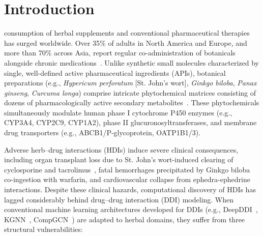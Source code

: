 \documentclass[10pt,journal,compsoc]{IEEEtran}
\begin{document}
\maketitle
\IEEEdisplaynontitleabstractindextext
\IEEEpeerreviewmaketitle

\section{Introduction}
 consumption of herbal supplements and conventional pharmaceutical therapies has surged worldwide. Over 35\% of adults in North America and Europe, and more than 70\% across Asia, report regular co-administration of botanicals alongside chronic medications~\cite{izzo2012interactions}. Unlike synthetic small molecules characterized by single, well-defined active pharmaceutical ingredients (APIs), botanical preparations (e.g., \textit{Hypericum perforatum} [St. John's wort], \textit{Ginkgo biloba}, \textit{Panax ginseng}, \textit{Curcuma longa}) comprise intricate phytochemical matrices consisting of dozens of pharmacologically active secondary metabolites~\cite{foti2012botanical}. These phytochemicals simultaneously modulate human phase I cytochrome P450 enzymes (e.g., CYP3A4, CYP2C9, CYP1A2), phase II glucuronosyltransferases, and membrane drug transporters (e.g., ABCB1/P-glycoprotein, OATP1B1/3).

Adverse herb--drug interactions (HDIs) induce severe clinical consequences, including organ transplant loss due to St. John's wort-induced clearing of cyclosporine and tacrolimus~\cite{ruschitzka1999stjohns}, fatal hemorrhages precipitated by Ginkgo biloba co-ingestion with warfarin, and cardiovascular collapse from ephedra-ephedrine interactions. Despite these clinical hazards, computational discovery of HDIs has lagged considerably behind drug--drug interaction (DDI) modeling. When conventional machine learning architectures developed for DDIs (e.g., DeepDDI~\cite{ryu2018deep}, KGNN~\cite{wang2019kgnn}, CompGCN~\cite{vashishth2020compgcn}) are adapted to herbal domains, they suffer from three structural vulnerabilities:
\end{document}
